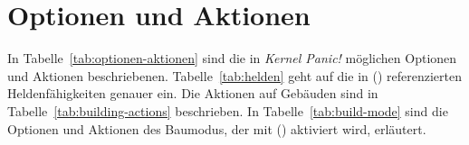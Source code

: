\section{Optionen und Aktionen}


%
%
%

In Tabelle~\ref{tab:optionen-aktionen} sind die in \emph{Kernel Panic!}
möglichen Optionen und Aktionen beschriebenen. Tabelle~\ref{tab:helden} geht
auf die in () referenzierten Heldenfähigkeiten genauer
ein. Die Aktionen auf Gebäuden sind in Tabelle~\ref{tab:building-actions}
beschrieben. In Tabelle~\ref{tab:build-mode} sind die Optionen und Aktionen des
Baumodus, der mit () aktiviert wird, erläutert.

